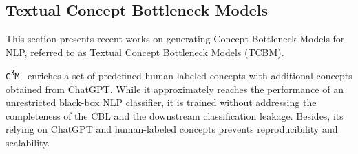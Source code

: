 \subsection{Textual Concept Bottleneck Models}
\label{related_work}
This section presents recent works on generating Concept Bottleneck Models for NLP, referred to  as Textual Concept Bottleneck Models (TCBM).

\texttt{C\textsuperscript{3}M}~\cite{cbm_plm} enriches a set of predefined human-labeled concepts with additional concepts obtained from ChatGPT. While it approximately reaches the performance of an unrestricted black-box NLP classifier, it is trained without addressing the completeness of the CBL and the downstream classification leakage. Besides, its relying on ChatGPT and human-labeled concepts prevents reproducibility and scalability.


